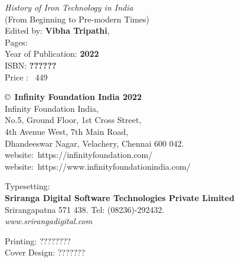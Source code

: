 \thispagestyle{empty}

\noindent
{\fontsize{11}{13}\selectfont\sl History of Iron Technology in India}\\
{\fontsize{7}{9}(From Beginning to Pre-modern Times)}\\
Edited by: {\bf Vibha Tripathi},\\


\noindent
Pages: {\bf\pageref{endchapter8}}\\
Year of Publication: {\bf 2022}\\
ISBN: {\bf ??????}\\
Price : {\rupee~449}

\bigskip

\noindent
\copyright\ {\bf Infinity Foundation India 2022}\\
Infinity Foundation India,\\ 
No.5, Ground Floor, 1st Cross Street,\\ 
4th Avenue West, 7th Main Road,\\
Dhandeeswar Nagar, Velachery, Chennai 600 042.\\
website:~{https://infinityfoundation.com/}\\
website:~{https://www.infinityfoundationindia.com/}

\bigskip

\noindent
Typesetting:\\ 
{\bf Sriranga Digital Software Technologies Private Limited}\\ 
Srirangapatna 571 438. Tel: (08236)-292432.\\
{\sl www.srirangadigital.com}

\bigskip

\noindent
Printing: ????????\\


\noindent
Cover Design: ???????\\






